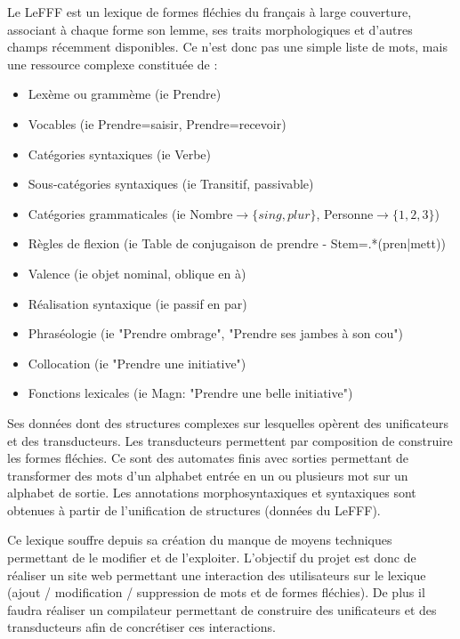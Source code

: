 \documentclass[12pt,a4paper]{article}
\begin{document}
Le LeFFF est un lexique de formes fléchies du français à large couverture, associant à chaque forme son lemme, ses traits morphologiques et d'autres champs récemment disponibles.
Ce n'est donc pas une simple liste de mots, mais une ressource complexe constituée de :
\begin{itemize}  
  \item Lexème ou grammème (ie Prendre)
  \item Vocables (ie Prendre=saisir, Prendre=recevoir)
  \item Catégories syntaxiques (ie Verbe)
  \item Sous-catégories syntaxiques (ie Transitif, passivable)
  \item Catégories grammaticales (ie Nombre$\rightarrow\{sing, plur\}$, Personne$\rightarrow\{1, 2, 3\}$)
  \item Règles de flexion (ie Table de conjugaison de prendre - Stem=.*(pren|mett))
  \item Valence (ie objet nominal, oblique en à)
  \item Réalisation syntaxique (ie passif en par)
  \item Phraséologie (ie "Prendre ombrage", "Prendre ses jambes à son cou")
  \item Collocation (ie "Prendre une initiative")
  \item Fonctions lexicales (ie Magn: "Prendre une belle initiative")
\end{itemize}

\smallbreak

Ses données dont des structures complexes sur lesquelles opèrent des unificateurs et des transducteurs.
\newline Les transducteurs permettent par composition de construire les formes fléchies. 
Ce sont des automates finis avec sorties permettant de transformer des mots d'un alphabet entrée en un ou plusieurs mot sur un alphabet de sortie.
\newline Les annotations morphosyntaxiques et syntaxiques sont obtenues à partir de l'unification de structures (données du LeFFF).

\smallbreak
Ce lexique souffre depuis sa création du manque de moyens techniques permettant de le modifier et de l'exploiter.
L'objectif du projet est donc de réaliser un site web permettant une interaction des utilisateurs sur le lexique (ajout / modification / suppression de mots et de formes fléchies). 
De plus il faudra réaliser un compilateur permettant de construire des unificateurs et des transducteurs afin de concrétiser ces interactions.
\end{document}
